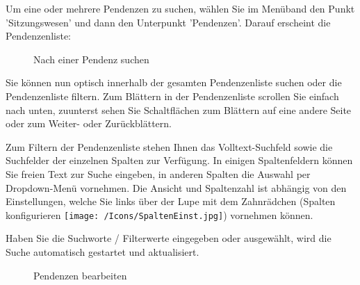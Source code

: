 \vspace{\baselineskip}

Um eine oder mehrere Pendenzen zu suchen, wählen Sie im Menüband den Punkt 'Sitzungswesen' und dann den Unterpunkt 'Pendenzen'. Darauf erscheint die Pendenzenliste:

\begin{figure}[H]
\caption{Nach einer Pendenz suchen}
\end{figure}

Sie können nun optisch innerhalb der gesamten Pendenzenliste suchen oder die Pendenzenliste filtern. Zum Blättern in der Pendenzenliste scrollen Sie einfach nach unten, zuunterst sehen Sie Schaltflächen zum Blättern auf eine andere Seite oder zum Weiter- oder Zurückblättern.

\begin{figure}[H]
\end{figure}

Zum Filtern der Pendenzenliste stehen Ihnen das Volltext-Suchfeld  sowie die Suchfelder der einzelnen Spalten  zur Verfügung. In einigen Spaltenfeldern können Sie freien Text zur Suche eingeben, in anderen Spalten die Auswahl per Dropdown-Menü vornehmen. Die Ansicht und Spaltenzahl ist abhängig von den Einstellungen, welche Sie links über der Lupe mit dem Zahnrädchen (Spalten konfigurieren \texttt{[image: /Icons/SpaltenEinst.jpg]}) vornehmen können.

\vspace{\baselineskip}


Haben Sie die Suchworte / Filterwerte eingegeben oder ausgewählt, wird die Suche automatisch gestartet und aktualisiert. 

\begin{figure}[H]
\caption{Pendenzen bearbeiten}
\end{figure}

